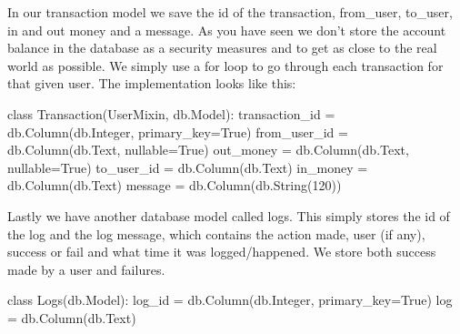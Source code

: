 In our transaction model we save the id of the transaction, from\_user, to\_user, in and out money and a message. As you have seen we don’t store the account balance in the database as a security measures and to get as close to the real world as possible. We simply use a for loop to go through each transaction for that given user. The implementation looks like this:

\begin{python}
class Transaction(UserMixin, db.Model):
   transaction_id = db.Column(db.Integer, primary_key=True)
   from_user_id = db.Column(db.Text, nullable=True)  
   out_money = db.Column(db.Text, nullable=True)
   to_user_id = db.Column(db.Text) 
   in_money = db.Column(db.Text)
   message = db.Column(db.String(120))
\end{python}

Lastly we have another database model called logs. This simply stores the id of the log and the log message, which contains the action made, user (if any), success or fail and what time it was logged/happened. We store both success made by a user and failures. 

\begin{python}
class Logs(db.Model):
    log_id = db.Column(db.Integer, primary_key=True)
    log = db.Column(db.Text)
\end{python}